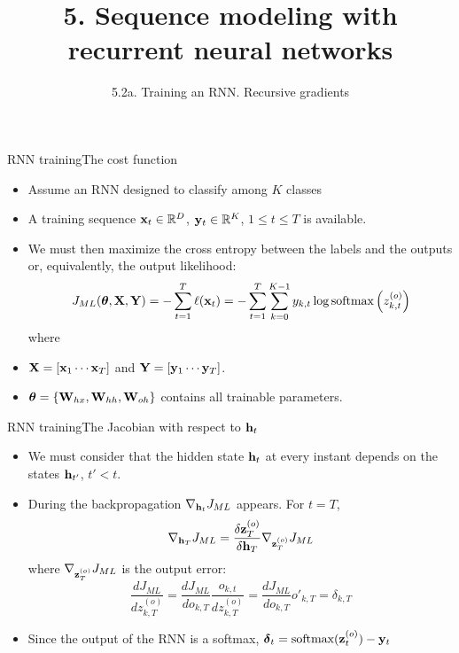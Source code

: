 \documentclass{beamer}
\title[5. Recurrent neural networks]{5. Sequence modeling with recurrent neural networks}
\subtitle{5.2a. Training an RNN. Recursive gradients}
\begin{document}
\maketitle

\begin{frame}{RNN training}{The cost function}
\begin{itemize}
\item Assume an RNN designed to classify among $K$ classes \item A training sequence ${\bf x}_t \in \mathbb{R}^D$, ${\bf y}_t \in \mathbb{R}^K$, $1 \leq t \leq T$ is available.
\item We must then maximize the cross entropy between the labels and the outputs or, equivalently, the output likelihood: 
\begin{equation}\label{eq:RNN_cost}
    J_{ML}({\boldsymbol \theta},{\bf X},{\bf Y})=- \sum_{t=1}^T \ell({\bf x}_t) =-\sum_{t=1}^T\sum_{k=0}^{K-1} y_{k,t} \log \text{softmax}\left(z^{(o)}_{k,t}\right)
\end{equation}
 where
 \item ${\bf X} = \left[{\bf x}_1 \cdots {\bf x}_T \right]$ and ${\bf Y} =\left[{\bf y}_1 \cdots {\bf y}_T\right]$.
\item  ${\boldsymbol \theta} = \{{\bf W}_{hx}, {\bf W}_{hh}, {\bf W}_{oh}\}$ contains all trainable parameters. 
\end{itemize}
\end{frame}

\begin{frame}{RNN training}{The Jacobian with respect to ${\bf h}_t$}
\begin{itemize}
\item We  must consider that the hidden state ${\bf h}_t$ at every instant depends on the states ${\bf h}_{t'}$, $t'<t$. \item During the backpropagation  $\nabla_{{\bf h}_t}J_{ML}$ appears. For   $t=T$,
\begin{equation}\label{eq:grad_J_h_T}
    \nabla_{{\bf h}_T}J_{ML} = \frac{\delta {\bf z}^{(o)}_T}{\delta{\bf h}_T} \nabla_{{\bf z}^{(o)}_T}J_{ML}
\end{equation}
where $ \nabla_{{\bf z}^{(o)}_T}J_{ML}$ is the output error: 
\begin{equation}
    \frac{dJ_{ML}}{d z^{(o)}_{k,T}} = 
    \frac{dJ_{ML}}{d o_{k,T}} \frac{o_{k,t}}{d z^{(o)}_{k,T}}  =\frac{dJ_{ML}}{d o_{k,T}} o'_{k,T} =\delta_{k,T}
\end{equation}
 \item Since the output of the RNN is a softmax, ${\boldsymbol \delta}_{t} =  \text{softmax}({\bf z}^{(o)}_{t}) - {\bf y}_{t}$
\end{itemize}
\end{frame}
\end{document}
